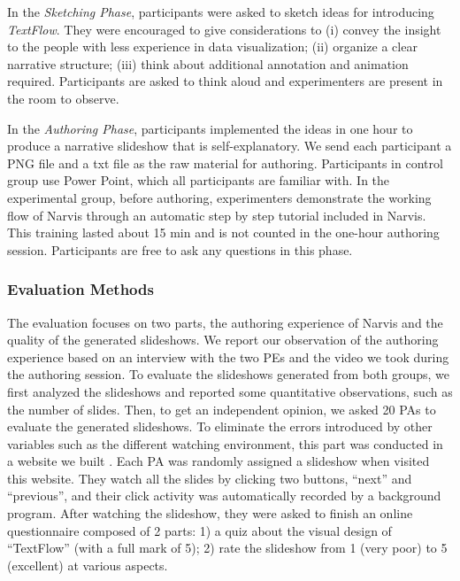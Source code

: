 In the \textit{Sketching Phase}, participants were asked to sketch ideas for introducing \textit{TextFlow}. They were encouraged to give considerations to (i) convey the insight to the people with less experience in data visualization; (ii) organize a clear narrative structure; (iii) think about additional annotation and animation required. Participants are asked to think aloud and experimenters are present in the room to observe. 

In the \textit{Authoring Phase}, participants implemented the ideas   
in one hour to produce a narrative slideshow that is self-explanatory. We send each participant a PNG file and a txt file as the raw material for authoring. Participants in control group use Power Point, which all participants are familiar with. In the experimental group, before authoring, experimenters demonstrate the working flow of Narvis through an automatic step by step tutorial included in Narvis. This training lasted about 15 min and is not counted in the one-hour authoring session. Participants are free to ask any questions in this phase.

\subsubsection{Evaluation Methods}
The evaluation focuses on two parts, the authoring experience of Narvis and the quality of the generated slideshows. We report our observation of the authoring experience based on an interview with the two PEs and the video we took during the authoring session. 
To evaluate the slideshows generated from both groups, we first analyzed  the slideshows and reported some quantitative observations, such as the number of slides.
Then, to get an independent opinion, we asked 20 PAs to evaluate the generated slideshows. To eliminate the errors introduced by other variables such as the different watching environment, this part was conducted in a website we built . Each PA was randomly assigned a slideshow when visited this website. They watch all the slides by clicking two buttons, ``next'' and ``previous'', and their click activity was automatically recorded by a background program.  After watching the slideshow, they were asked to finish an online questionnaire composed of 2 parts: 1) a quiz about the visual design of ``TextFlow'' (with a full mark of 5); 2) rate the slideshow  from 1 (very poor) to 5 (excellent) at various aspects. 

